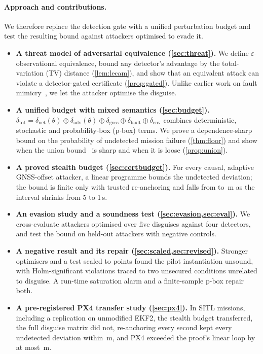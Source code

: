 \documentclass[letterpaper,twocolumn,10pt]{article}
\newcommand{\dnet}{\delta_{\mathrm{net}}}
\newcommand{\dfault}{\delta_{\mathrm{fault}}}
\newcommand{\denv}{\delta_{\mathrm{env}}}
\newcommand{\dgnss}{\delta_{\mathrm{gnss}}}
\newcommand{\dadv}{\delta_{\mathrm{adv}}}
\newcommand{\dtot}{\delta_{\mathrm{tot}}}
\theoremstyle{remark}
\begin{document}
\paragraph{Approach and contributions.}
We therefore replace the detection gate with a unified perturbation budget and
test the resulting bound against attackers optimised to evade it.
\begin{itemize}
\item \textbf{A threat model of adversarial equivalence (\cref{sec:threat}).}
  We define $\varepsilon$-observational equivalence, bound any detector's
  advantage by the total-variation (TV) distance (\cref{lem:lecam}), and show
  that an equivalent attack can violate a detector-gated certificate
  (\cref{prop:gated}). Unlike earlier work on fault
  mimicry~\cite{roy2023,bai2017,hashemi2018}, we let the attacker optimise
  the disguise.
\item \textbf{A unified budget with mixed semantics (\cref{sec:budget}).}
  $\dtot=\dnet(\theta)\oplus\dadv(\theta)\oplus\dgnss\oplus\dfault\oplus\denv$
  combines deterministic, stochastic and probability-box (p-box) terms. We prove
  a dependence-sharp bound on the probability of undetected mission failure
  (\cref{thm:floor}) and show when the union
  bound~\cite{makarov1981,ruschendorf1982} is sharp and when it is loose
  (\cref{prop:union}).
\item \textbf{A proved stealth budget (\cref{sec:certbudget}).} For every causal,
  adaptive GNSS-offset attacker, a linear programme bounds the undetected
  deviation; the bound is finite only with trusted re-anchoring and falls from
  \nBoundTaFive{} to \nBoundTaOne\,m as the interval shrinks from 5 to 1\,s.
\item \textbf{An evasion study and a soundness test
  (\cref{sec:evasion,sec:eval}).} We cross-evaluate attackers optimised over
  five disguises against four detectors, and test the bound on held-out
  attackers with negative controls.
\item \textbf{A negative result and its repair (\cref{sec:scaled,sec:revised}).}
  Stronger optimisers and a test scaled to \nROneTests{} points found the
  pilot instantiation unsound, with \nROneViol{} Holm-significant violations
  traced to two unsecured conditions unrelated to disguise. A run-time saturation
  alarm and a finite-sample p-box repair both.
\item \textbf{A pre-registered PX4 transfer study (\cref{sec:px4}).} In
  \nPxMissionsAll{} SITL missions, including a replication on unmodified EKF2, the
  stealth budget transferred, the full disguise matrix did not, re-anchoring every
  second kept every undetected deviation within \nPxTaWorstDOneGate\,m, and PX4
  exceeded the proof's linear loop by at most \nMmFivePlusMax\,m.
\end{itemize}
\end{document}
